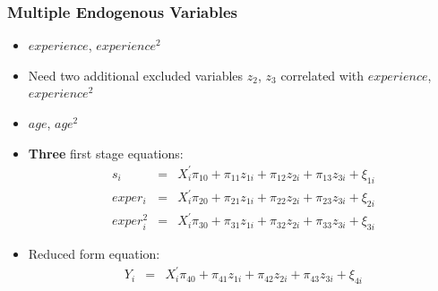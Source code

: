 \documentclass[pdftex]{beamer}
\begin{document}
\begin{frame}
\frametitle{Multiple Endogenous Variables}
\begin{itemize}
\item  $experience$, $experience^{2}$
\item  Need two additional excluded variables $z_{2}$, $z_{3}$ correlated with $experience$, $experience^{2}$
\item $age$, $age^{2}$
\item \textbf{Three} first stage equations:
\begin{eqnarray*}
s_i &=& X_{i}^{'}\pi_{10}+\pi_{11}z_{1i}+\pi_{12}z_{2i}+\pi_{13}z_{3i}+\xi_{1i}\\
exper_i &=& X_{i}^{'}\pi_{20}+\pi_{21}z_{1i}+\pi_{22}z_{2i}+\pi_{23}z_{3i}+\xi_{2i}\\
exper_i^{2} &=&  X_{i}^{'}\pi_{30}+\pi_{31}z_{1i}+\pi_{32}z_{2i}+\pi_{33}z_{3i}+\xi_{3i}
\end{eqnarray*}

\item Reduced form equation:
\begin{eqnarray*}
Y_i &=& X_{i}^{'}\pi_{40}+\pi_{41}z_{1i}+\pi_{42}z_{2i}+\pi_{43}z_{3i}+\xi_{4i}\\
\end{eqnarray*}
\end{itemize}
\end{frame}
\end{document}
